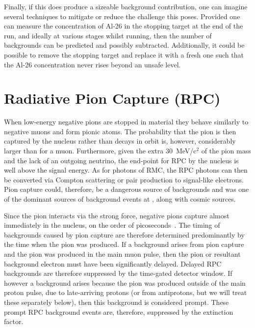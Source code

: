 Finally, if this does produce a sizeable background contribution, one can imagine several techniques to mitigate or reduce the challenge this poses.
Provided one can measure the concentration of Al-26 in the stopping target at the end of the run, and ideally at various stages whilst running, then the number of backgrounds can be predicted and possibly subtracted.
Additionally, it could be possible to remove the stopping target and replace it with a fresh one such that the Al-26 concentration never rises beyond an unsafe level.

\section{Radiative Pion Capture (\acs{RPC})}
When low-energy negative pions are stopped in material they behave similarly to negative muons and form pionic atoms.
The probability that the pion is then captured by the nucleus rather than decays in orbit is, however, considerably larger than for a muon.
Furthermore, given the extra 30~MeV/c$^2$ of the pion mass and the lack of an outgoing neutrino, the end-point for \acf{RPC} by the nucleus is well above the \mueconv signal energy.
As for photons of \ac{RMC}, the \ac{RPC} photons can then be converted via Compton scattering or pair production to signal-like electrons.
Pion capture could, therefore, be a dangerous source of backgrounds and was one of the dominant sources of background events at \sindrumII, along with cosmic sources.

Since the pion interacts via the strong force, negative pions capture almost immediately in the nucleus, on the order of picoseconds~\cite{Engelhardt:1975ct}.
The timing of backgrounds caused by pion capture are therefore determined predominantly by the time when the pion was produced.
If a background arises from pion capture and the pion was produced in the main muon pulse, then the pion or resultant background electron must have been significantly delayed.
Delayed \ac{RPC} backgrounds are therefore suppressed by the time-gated detector window.
If however a background arises because the pion was produced outside of the main proton pulse, due to late-arriving protons (or from antiprotons, but we will treat these separately below), then this background is considered prompt.
These prompt \ac{RPC} background events are, therefore, suppressed by the extinction factor.

